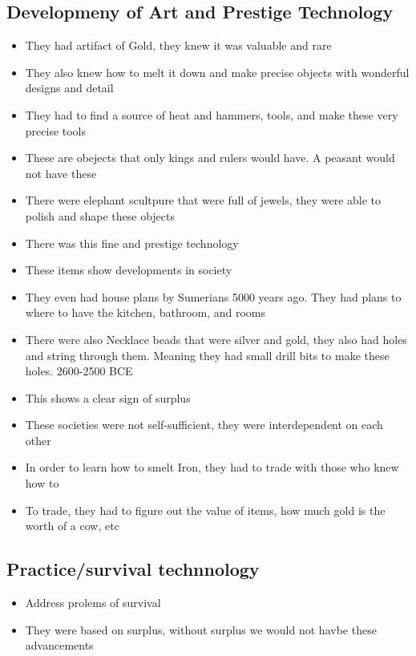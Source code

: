 \documentclass{article}
\begin{document}
\subsection{Developmeny of Art and Prestige Technology}
\begin{itemize}
  \item They had artifact of Gold, they knew
    it was valuable and rare
  \item They also knew how to melt it down and make precise objects with
    wonderful designs and detail
  \item They had to find a source of heat and hammers, tools,
    and make these very precise tools
  \item These are obejects that only kings and rulers
    would have. A peasant would not have these
  \item There were elephant scultpure that were full of jewels,
    they were able to polish and shape these objects
  \item There was this fine and prestige technology
  \item These items show developments in society
  \item They even had house plans by Sumerians 5000 years ago.
    They had plans to where to have the kitchen, bathroom, and rooms
  \item There were also Necklace beads that were silver and gold, they also
    had holes and string through them. Meaning they had small drill bits to make
    these holes. 2600-2500 BCE
  \item This shows a clear sign of surplus
  \item These societies were not self-sufficient, they were
    interdependent on each other
  \item In order to learn how to smelt Iron, they had to
    trade with those who knew how to
  \item To trade, they had to figure out the value of items,
    how much gold is the worth of a cow, etc

\end{itemize}

\subsection{Practice/survival technnology}
\begin{itemize}
  \item Address prolems of survival
  \item They were based on surplus, without surplus we would not havbe these advancements
\end{itemize}
\end{document}
